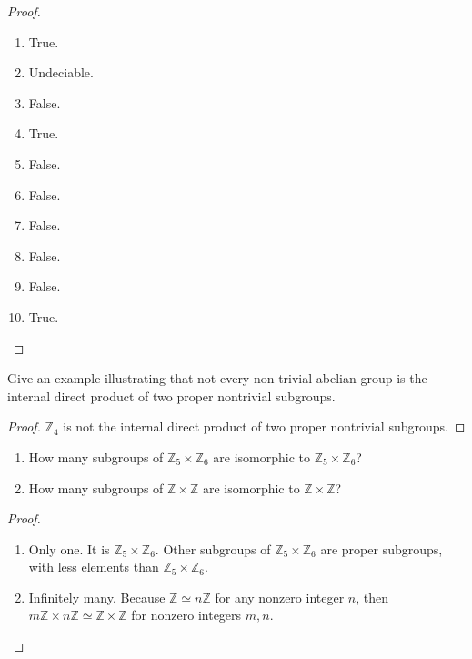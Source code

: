 \begin{proof}
    \begin{enumerate}[label={\textbf{\alph*.}}]
        \item True.
        \item Undeciable.
        \item False.
        \item True.
        \item False.
        \item False.
        \item False.
        \item False.
        \item False.
        \item True.
    \end{enumerate}
\end{proof}

\newpage
\begin{exercise}
    Give an example illustrating that not every non trivial abelian group is the internal direct product of two proper nontrivial subgroups.
\end{exercise}

\begin{proof}
    $\mathbb{Z}_{4}$ is not the internal direct product of two proper nontrivial subgroups.
\end{proof}

\newpage
\begin{exercise}
    \begin{enumerate}
        \item How many subgroups of $\mathbb{Z}_{5} \times \mathbb{Z}_{6}$ are isomorphic to $\mathbb{Z}_{5} \times \mathbb{Z}_{6}$?
        \item How many subgroups of $\mathbb{Z} \times \mathbb{Z}$ are isomorphic to $\mathbb{Z}\times \mathbb{Z}$?
    \end{enumerate}
\end{exercise}

\begin{proof}
    \begin{enumerate}
        \item Only one. It is $\mathbb{Z}_{5}\times\mathbb{Z}_{6}$. Other subgroups of $\mathbb{Z}_{5}\times\mathbb{Z}_{6}$ are proper subgroups, with less elements than $\mathbb{Z}_{5}\times\mathbb{Z}_{6}$.
        \item Infinitely many. Because $\mathbb{Z}\simeq n\mathbb{Z}$ for any nonzero integer $n$, then $m\mathbb{Z} \times n\mathbb{Z} \simeq \mathbb{Z}\times\mathbb{Z}$ for nonzero integers $m, n$.
    \end{enumerate}
\end{proof}

